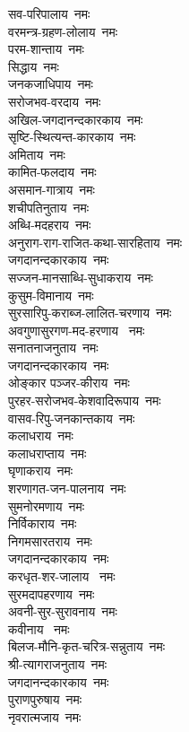 \begin{flushleft}
\begin{multicols}{2}
सव-परिपालाय~नमः\hfill{}\\
वरमन्त्र-ग्रहण-लोलाय~नमः\\
परम-शान्ताय~नमः\\
सिद्धाय~नमः\\
जनकजाधिपाय~नमः\\
सरोजभव-वरदाय~नमः\\
अखिल-जगदानन्दकारकाय~नमः\\
सृष्टि-स्थित्यन्त-कारकाय~नमः\\
अमिताय~नमः\\
कामित-फलदाय~नमः\\
असमान-गात्राय~नमः\hfill{}\\
शचीपतिनुताय~नमः\\
अब्धि-मदहराय~नमः\\
अनुराग-राग-राजित-कथा-सारहिताय~नमः\\
जगदानन्दकारकाय~नमः\\
सज्जन-मानसाब्धि-सुधाकराय~नमः\\
कुसुम-विमानाय~नमः\\
सुरसारिपु-कराब्ज-लालित-चरणाय~नमः\\
अवगुणासुरगण-मद-हरणाय ~नमः\\
सनातनाजनुताय~नमः\\
जगदानन्दकारकाय~नमः\hfill{}\\
ओङ्कार पञ्जर-कीराय~नमः\\
पुरहर-सरोजभव-केशवादिरूपाय~नमः\\
वासव-रिपु-जनकान्तकाय~नमः\\
कलाधराय~नमः\\
कलाधराप्ताय~नमः\\
घृणाकराय~नमः\\
शरणागत-जन-पालनाय~नमः\\
सुमनोरमणाय~नमः\\
निर्विकाराय~नमः\\
निगमसारतराय~नमः\hfill{}\\
जगदानन्दकारकाय~नमः\\
करधृत-शर-जालाय ~नमः\\
सुरमदापहरणाय~नमः\\
अवनी-सुर-सुरावनाय~नमः\\
कवीनाय ~नमः\\
बिलज-मौनि-कृत-चरित्र-सन्नुताय~नमः\\
श्री-त्यागराजनुताय~नमः\\
जगदानन्दकारकाय~नमः\\
पुराणपुरुषाय~नमः\\
नृवरात्मजाय~नमः\hfill{}\\

\end{multicols}
\end{flushleft}
